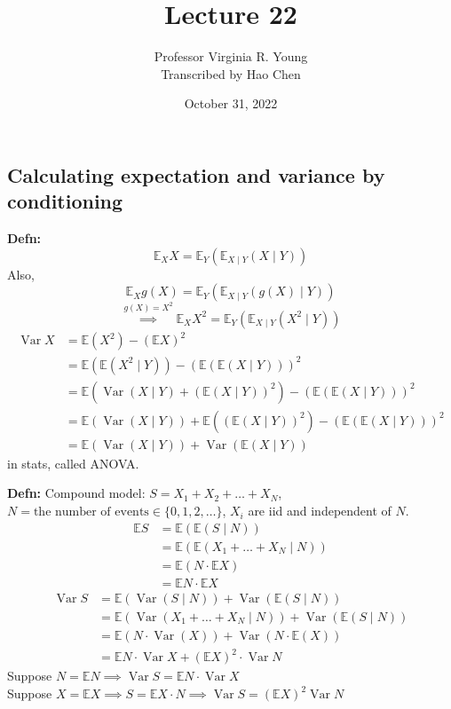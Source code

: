 \documentclass[a4paper]{article}
\title{Lecture 22}
\author{Professor Virginia R. Young\\ \small{Transcribed by Hao Chen}}
\date{October 31, 2022}
\newcommand{\n}{\hfill\break}
\newcommand{\defn}[1]{\par\noindent\settowidth{\hangindent}{\textbf{Defn: }}\textbf{Defn: }#1\n}
\newcommand{\Avg}{\mathbb{E}}
\newcommand{\E}{\Avg}
\DeclareMathOperator{\Var}{Var}
\begin{document}
\maketitle

\subsection*{Calculating expectation and variance by conditioning}
\defn{
    \[\E_XX=\E_Y(\E_{X\mid Y}(X\mid Y))\]
    Also,
    \[\E_Xg(X)=\E_Y(\E_{X\mid Y}(g(X)\mid Y))\]
    \[\overset{g(X)=X^2}{\implies}\E_XX^2=\E_Y(\E_{X\mid Y}(X^2\mid Y))\]
    \begin{align*}
        \Var X &= \E(X^2)-(\E X)^2 \\
        &=\E(\E(X^2\mid Y))-(\E(\E(X\mid Y)))^2 \\
        &=\E(\Var(X\mid Y)+(\E(X\mid Y))^2)-(\E(\E(X\mid Y)))^2 \\
        &=\E(\Var(X\mid Y))+\E((\E(X\mid Y))^2)-(\E(\E(X\mid Y)))^2 \\
        &=\E(\Var(X\mid Y))+\Var(\E(X\mid Y))
    \end{align*}
    in stats, called ANOVA.
}

\defn{
    Compound model: $S=X_1+X_2+\dots+X_N$, $N=\text{the number of events}\in\{0,1,2,\dots\}$, $X_i$ are iid and independent of $N$.
    \begin{align*}
        \E S&=\E(\E(S\mid N)) \\
        &=\E(\E(X_1+\dots+X_N\mid N)) \\
        &=\E(N\cdot\E X) \\
        &=\E N\cdot \E X
    \end{align*}
    \begin{align*}
        \Var S&=\E(\Var(S\mid N))+\Var(\E(S\mid N)) \\
        &=\E(\Var(X_1+\dots+X_N\mid N))+\Var(\E(S\mid N)) \\
        &=\E(N\cdot\Var(X))+\Var(N\cdot\E(X)) \\
        &=\E N\cdot\Var X+(\E X)^2\cdot\Var N
    \end{align*}
    Suppose $N=\E N\implies\Var S=\E N\cdot\Var X$ \\
    Suppose $X=\E X\implies S=\E X\cdot N\implies\Var S=(\E X)^2\Var N$
}
\end{document}
